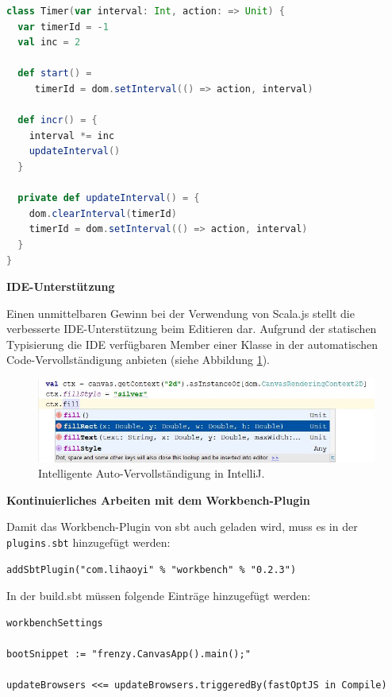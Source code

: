 \documentclass[a4paper, 12pt, hidelinks, listof=totoc, listoftables=totoc, bibliography=totoc]{scrreprt}
\newcommand{\code}[1]{\lstinline[language=Scala, style=inline]|#1|}
\newcommand{\MyMiniSec}[1]{\rmfamily\fontsize{12}{15}\selectfont
	\vspace{7pt}\textbf{#1} %
}
\begin{document}
\pagebreak

\begin{lstlisting}[language=Scala, caption={Die Timer-Klasse des Canvas-Beispiels.}, label={code:canvas-timer}]
class Timer(var interval: Int, action: => Unit) {
  var timerId = -1
  val inc = 2

  def start() =
     timerId = dom.setInterval(() => action, interval)
   
  def incr() = {
    interval *= inc
    updateInterval()
  }

  private def updateInterval() = {
    dom.clearInterval(timerId)
    timerId = dom.setInterval(() => action, interval)
  }
}
\end{lstlisting}


\MyMiniSec{IDE-Unterstützung}

Einen unmittelbaren Gewinn bei der Verwendung von Scala.js stellt die verbesserte \ac{IDE}-Unterstützung beim Editieren dar. 
Aufgrund der statischen Typisierung die \ac{IDE} verfügbaren Member einer Klasse in der automatischen Code-Vervollständigung anbieten (siehe Abbildung \ref{fig:typesafe-autocomplete}).

\begin{figure}[!h]
    \centering
    \includegraphics[width=1.0\textwidth]{typesafe-autocomplete}
    \caption{Intelligente Auto-Vervollständigung in IntelliJ.}
    \label{fig:typesafe-autocomplete}
\end{figure}


\MyMiniSec{Kontinuierliches Arbeiten mit dem Workbench-Plugin}

Damit das Workbench-Plugin von sbt auch geladen wird, muss es in der \code{plugins.sbt} hinzugefügt werden:

\begin{lstlisting}[style=snippet]
addSbtPlugin("com.lihaoyi" % "workbench" % "0.2.3")
\end{lstlisting}

In der build.sbt müssen folgende Einträge hinzugefügt werden:
\begin{lstlisting}[style=snippet]
workbenchSettings

bootSnippet := "frenzy.CanvasApp().main();"

updateBrowsers <<= updateBrowsers.triggeredBy(fastOptJS in Compile)
\end{lstlisting}
\end{document}
